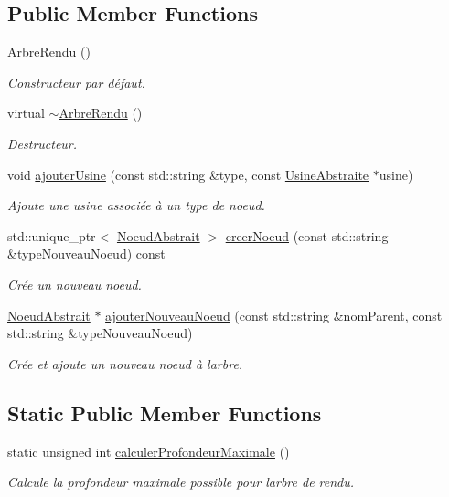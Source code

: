 \subsection*{Public Member Functions}
\begin{DoxyCompactItemize}
\item 
\hyperlink{group__inf2990_gaef1e98a66c4f1d3b468c786edee45ae6}{Arbre\+Rendu} ()
\begin{DoxyCompactList}\small\item\em Constructeur par défaut. \end{DoxyCompactList}\item 
virtual \hyperlink{group__inf2990_gadb462923759da0ff632dad097b7bfdab}{$\sim$\+Arbre\+Rendu} ()
\begin{DoxyCompactList}\small\item\em Destructeur. \end{DoxyCompactList}\item 
void \hyperlink{group__inf2990_ga296a744837fb7b779fadf2e8c62e6577}{ajouter\+Usine} (const std\+::string \&type, const \hyperlink{class_usine_abstraite}{Usine\+Abstraite} $\ast$usine)
\begin{DoxyCompactList}\small\item\em Ajoute une usine associée à un type de noeud. \end{DoxyCompactList}\item 
std\+::unique\+\_\+ptr$<$ \hyperlink{class_noeud_abstrait}{Noeud\+Abstrait} $>$ \hyperlink{group__inf2990_gaead1f3ae9de5de53e31ad9e886ba259c}{creer\+Noeud} (const std\+::string \&type\+Nouveau\+Noeud) const 
\begin{DoxyCompactList}\small\item\em Crée un nouveau noeud. \end{DoxyCompactList}\item 
\hyperlink{class_noeud_abstrait}{Noeud\+Abstrait} $\ast$ \hyperlink{group__inf2990_gac10e5f0623af502d67f72aef764206a3}{ajouter\+Nouveau\+Noeud} (const std\+::string \&nom\+Parent, const std\+::string \&type\+Nouveau\+Noeud)
\begin{DoxyCompactList}\small\item\em Crée et ajoute un nouveau noeud à l\textquotesingle{}arbre. \end{DoxyCompactList}\end{DoxyCompactItemize}
\subsection*{Static Public Member Functions}
\begin{DoxyCompactItemize}
\item 
static unsigned int \hyperlink{group__inf2990_gacf0e53d52040b07cd6550fda79867bd5}{calculer\+Profondeur\+Maximale} ()
\begin{DoxyCompactList}\small\item\em Calcule la profondeur maximale possible pour l\textquotesingle{}arbre de rendu. \end{DoxyCompactList}\end{DoxyCompactItemize}

